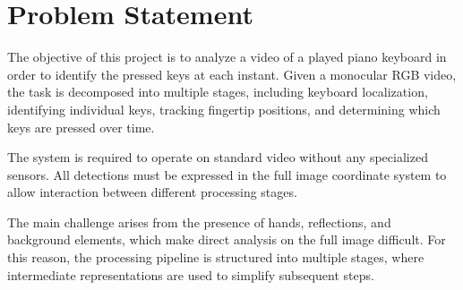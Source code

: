 \section{Problem Statement}

The objective of this project is to analyze a video of a played piano keyboard
in order to identify the pressed keys at each instant.
Given a monocular RGB video, the task is decomposed into multiple stages,
including keyboard localization, identifying individual keys, tracking fingertip positions, and determining
which keys are pressed over time.

The system is required to operate on standard video without any
specialized sensors.
All detections must be expressed in the full image coordinate system
to allow interaction between different processing stages.

The main challenge arises from the presence of hands, reflections,
and background elements, which make direct analysis on the full image
difficult.
For this reason, the processing pipeline is structured into multiple
stages, where intermediate representations are used to simplify
subsequent steps.
